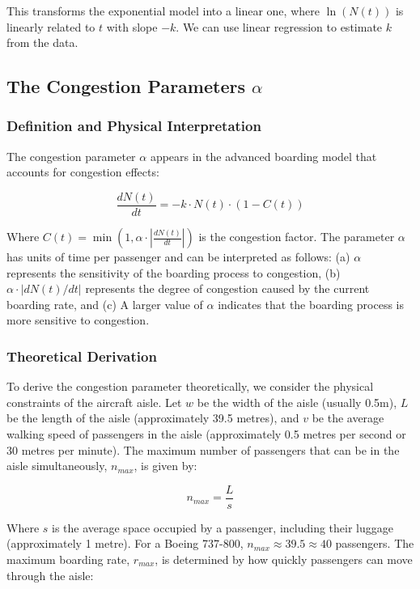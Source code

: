 \documentclass[12pt]{article}
\begin{document}
This transforms the exponential model into a linear one, where $\ln(N(t))$ is linearly related to $t$ with slope $-k$. We can use linear regression to estimate $k$ from the data.

\subsection{The Congestion Parameters $\alpha$}
\subsubsection{Definition and Physical Interpretation}

The congestion parameter $\alpha$ appears in the advanced boarding model that accounts for congestion effects:

\begin{equation*}
\frac{dN(t)}{dt} = -k \cdot N(t) \cdot (1 - C(t))
\end{equation*}

Where $C(t) = \min\left(1, \alpha \cdot \left|\frac{dN(t)}{dt}\right|\right)$ is the congestion factor. The parameter $\alpha$ has units of time per passenger and can be interpreted as follows: (a) $\alpha$ represents the sensitivity of the boarding process to congestion, (b) $\alpha \cdot |dN(t)/dt|$ represents the degree of congestion caused by the current boarding rate, and (c) A larger value of $\alpha$ indicates that the boarding process is more sensitive to congestion.

\subsubsection{Theoretical Derivation}

To derive the congestion parameter theoretically, we consider the physical constraints of the aircraft aisle. Let $w$ be the width of the aisle (usually 0.5m), $L$ be the length of the aisle (approximately 39.5 metres), and $v$ be the average walking speed of passengers in the aisle (approximately 0.5 metres per second or 30 metres per minute). The maximum number of passengers that can be in the aisle simultaneously, $n_{max}$, is given by:

\begin{equation}
n_{max} = \frac{L}{s}
\end{equation}

Where $s$ is the average space occupied by a passenger, including their luggage (approximately 1 metre). For a Boeing 737-800, $n_{max} \approx 39.5 \approx 40$ passengers. The maximum boarding rate, $r_{max}$, is determined by how quickly passengers can move through the aisle:
\end{document}
